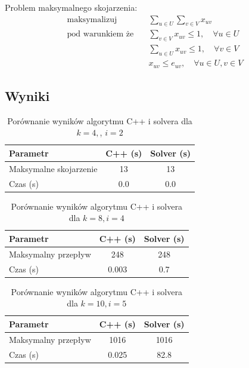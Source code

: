 \documentclass{article}
\begin{document}
Problem maksymalnego skojarzenia:
\begin{align*}
    \text{maksymalizuj} \quad & \sum_{u \in U} \sum_{v \in V} x_{uv} \\
    \text{pod warunkiem że} \quad & \sum_{v \in V} x_{uv} \leq 1, \quad \forall u \in U \\
    & \sum_{u \in U} x_{uv} \leq 1, \quad \forall v \in V \\
    & x_{uv} \leq e_{uv}, \quad \forall u \in U, v \in V
\end{align*}

\subsection*{Wyniki}
\begin{table}[H]
\centering
\caption{Porównanie wyników algorytmu C++ i solvera dla $k=4,$, $i=2$}
\begin{tabular}{lcc}
\toprule
Parametr                   & C++ (s) & Solver (s) \\
\midrule
Maksymalne skojarzenie & 13      & 13       \\
Czas (s)                      & 0.0    & 0.0    \\
\bottomrule
\end{tabular}
\end{table}

\begin{table}[H]
\centering
\caption{Porównanie wyników algorytmu C++ i solvera dla $k=8, i=4$}
\begin{tabular}{lcc}
\toprule
Parametr                   & C++ (s) & Solver (s) \\
\midrule
Maksymalny przepływ       & 248      & 248       \\
Czas (s)                      & 0.003    & 0.7    \\
\bottomrule
\end{tabular}
\end{table}

\begin{table}[H]
\centering
\caption{Porównanie wyników algorytmu C++ i solvera dla $k=10, i=5$}
\begin{tabular}{lcc}
\toprule
Parametr                   & C++ (s) & Solver (s) \\
\midrule
Maksymalny przepływ       & 1016      &  1016       \\
Czas (s)                      & 0.025    &  	82.8    \\
\bottomrule
\end{tabular}
\end{table}
\end{document}
